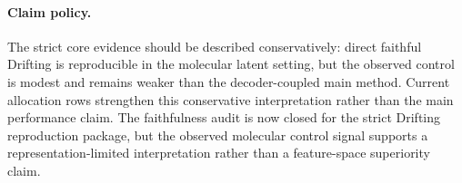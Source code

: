 \documentclass[letterpaper]{article}
\begin{document}
\begin{table}[!h]
\centering
\caption{Positive/negative allocation sweep for faithful Drifting. Allocation
improves diversity more reliably than QED target tracking.}
\label{tab:supp-faithful-allocation}
\end{table}

\paragraph{Claim policy.}
The strict core evidence should be described conservatively: direct faithful
Drifting is reproducible in the molecular latent setting, but the observed
control is modest and remains weaker than the decoder-coupled main method.
Current allocation rows strengthen this conservative interpretation rather
than the main performance claim. The faithfulness audit is now closed for the
strict Drifting reproduction package, but the observed molecular control signal
supports a representation-limited interpretation rather than a feature-space
superiority claim.
\end{document}

